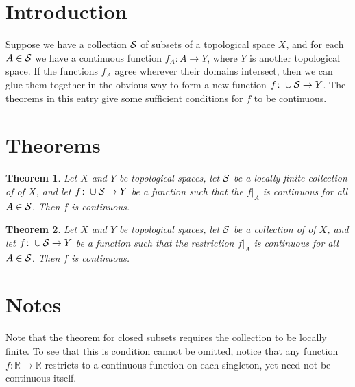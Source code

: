 \documentclass[12pt]{article}
\def\R{\mathbb{R}}
\newtheorem{thm}{Theorem}
\begin{document}

\section*{Introduction}

Suppose we have a collection $\cal S$ of subsets of a topological space $X$,
and for each $A\in\cal S$ we have a continuous function $f_A\colon A\to Y$,
where $Y$ is another topological space.
If the functions $f_A$ agree wherever their domains intersect,
then we can glue them together in the obvious way to form a new function
$f\colon\cup{\cal S}\to Y$.
The theorems in this entry
give some sufficient conditions for $f$ to be continuous.

\section*{Theorems}

\begin{thm}
Let $X$ and $Y$ be topological spaces,
let $\cal S$ be a locally finite collection of  of $X$,
and let $f\colon\cup{\cal S}\to Y$ be a function
such that the  $f|_A$
is continuous for all $A\in\cal S$.
Then $f$ is continuous.
\end{thm}

\begin{thm}
Let $X$ and $Y$ be topological spaces,
let $\cal S$ be a collection of  of $X$,
and let $f\colon\cup{\cal S}\to Y$ be a function
such that the restriction $f|_A$ is continuous for all $A\in\cal S$.
Then $f$ is continuous.
\end{thm}

\section*{Notes}

Note that the theorem for closed subsets
requires the collection to be locally finite.
To see that this is condition cannot be omitted,
notice that any function $f\colon\R\to\R$
restricts to a continuous function on each singleton,
yet need not be continuous itself.
\end{document}
